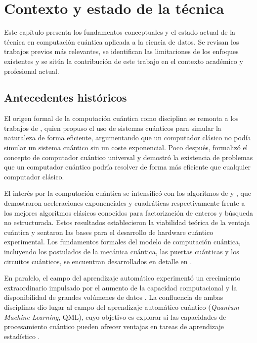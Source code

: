\chapter{Contexto y estado de la técnica}

Este capítulo presenta los fundamentos conceptuales y el estado actual de la técnica en computación cuántica aplicada a la ciencia de datos. Se revisan los trabajos previos más relevantes, se identifican las limitaciones de los enfoques existentes y se sitúa la contribución de este trabajo en el contexto académico y profesional actual.

\section{Antecedentes históricos}

El origen formal de la computación cuántica como disciplina se remonta a los trabajos de \cite{feynman1982}, quien propuso el uso de sistemas cuánticos para simular la naturaleza de forma eficiente, argumentando que un computador clásico no podía simular un sistema cuántico sin un coste exponencial. Poco después, \cite{deutsch1985} formalizó el concepto de computador cuántico universal y demostró la existencia de problemas que un computador cuántico podría resolver de forma más eficiente que cualquier computador clásico.

El interés por la computación cuántica se intensificó con los algoritmos de \cite{shor1994} y \cite{grover1996}, que demostraron aceleraciones exponenciales y cuadráticas respectivamente frente a los mejores algoritmos clásicos conocidos para factorización de enteros y búsqueda no estructurada. Estos resultados establecieron la viabilidad teórica de la ventaja cuántica y sentaron las bases para el desarrollo de hardware cuántico experimental. Los fundamentos formales del modelo de computación cuántica, incluyendo los postulados de la mecánica cuántica, las puertas cuánticas y los circuitos cuánticos, se encuentran desarrollados en detalle en \cite{nielsen2010}.

En paralelo, el campo del aprendizaje automático experimentó un crecimiento extraordinario impulsado por el aumento de la capacidad computacional y la disponibilidad de grandes volúmenes de datos \citep{jordan2015}. La confluencia de ambas disciplinas dio lugar al campo del aprendizaje automático cuántico (\textit{Quantum Machine Learning}, QML), cuyo objetivo es explorar si las capacidades de procesamiento cuántico pueden ofrecer ventajas en tareas de aprendizaje estadístico \citep{biamonte2017}.

